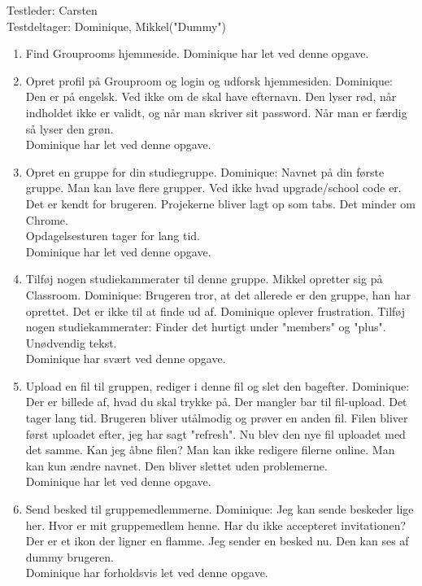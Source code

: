 \documentclass[12pt]{article}
\begin{document}
Testleder: Carsten\\
Testdeltager: Dominique, Mikkel("Dummy")\\
\begin{enumerate}
  \item Find Grouprooms hjemmeside.
  Dominique har let ved denne opgave.

\item Opret profil på Grouproom og login og udforsk hjemmesiden.
Dominique: Den er på engelsk. Ved ikke om de skal have efternavn. Den lyser rød, når indholdet ikke er validt, og når man skriver sit password. Når man er færdig så lyser den grøn. \\
Dominique har let ved denne opgave.

\item Opret en gruppe for din studiegruppe.
Dominique: Navnet på din første gruppe. Man kan lave flere grupper. Ved ikke hvad upgrade/school code er.
Det er kendt for brugeren. Projekerne bliver lagt op som tabs. Det minder om Chrome. \\
Opdagelsesturen tager for lang tid.\\
Dominique har let ved denne opgave.

\item Tilføj nogen studiekammerater til denne gruppe.
Mikkel opretter sig på Classroom.
Dominique: Brugeren tror, at det allerede er den gruppe, han har oprettet.
Det er ikke til at finde ud af. Dominique oplever frustration.
Tilføj nogen studiekammerater: Finder det hurtigt under "members" og "plus". Unødvendig tekst.\\
Dominique har svært ved denne opgave. 

\item Upload en fil til gruppen, rediger i denne fil og slet den bagefter.
Dominique: Der er billede af, hvad du skal trykke på. Der mangler bar til fil-upload. Det tager lang tid. Brugeren bliver utålmodig og prøver en anden fil.
Filen bliver først uploadet efter, jeg har sagt "refresh".
Nu blev den nye fil uploadet med det samme.
Kan jeg åbne filen? Man kan ikke redigere filerne online. Man kan kun ændre navnet.
Den bliver slettet uden problemerne.\\
Dominique har let ved denne opgave.

\item Send besked til gruppemedlemmerne.
Dominique: Jeg kan sende beskeder lige her. Hvor er mit gruppemedlem henne. Har du ikke accepteret invitationen? Der er et ikon der ligner en flamme. Jeg sender en besked nu. Den kan ses af dummy brugeren.\\
Dominique har forholdsvis let ved denne opgave.


\end{enumerate}
\end{document}
